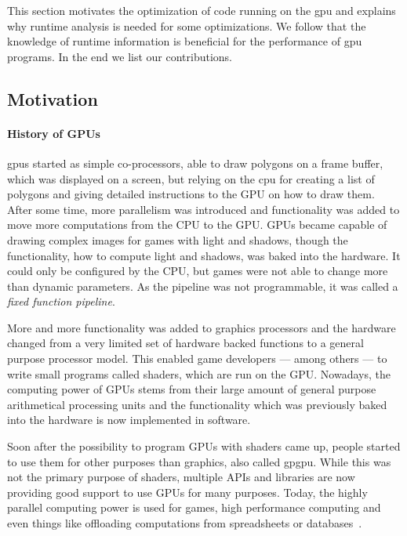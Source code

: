 {}
This section motivates the optimization of code running on the \gls{gpu} and explains why runtime analysis is needed for some optimizations.
We follow that the knowledge of runtime information is beneficial for the performance of \gls{gpu} programs. In the end we list our contributions.

\subsection{Motivation}
\label{sub:motivation}
\paragraph{History of GPUs} \Glspl{gpu} started as simple co-processors, able to draw polygons on a frame buffer, which was displayed on a screen, but relying on the \gls{cpu} for creating a list of polygons and giving detailed instructions to the GPU on how to draw them.
After some time, more parallelism was introduced and functionality was added to move more computations from the CPU to the GPU.
GPUs became capable of drawing complex images for games with light and shadows, though the functionality, how to compute light and shadows, was baked into the hardware.
It could only be configured by the CPU, but games were not able to change more than dynamic parameters.
As the pipeline was not programmable, it was called a \emph{fixed function pipeline}.

More and more functionality was added to graphics processors and the hardware changed from a very limited set of hardware backed functions to a general purpose processor model.
This enabled game developers --- among others --- to write small programs called shaders, which are run on the GPU.
Nowadays, the computing power of GPUs stems from their large amount of general purpose arithmetical processing units and the functionality which was previously baked into the hardware is now implemented in software.~\cite{McClanahan2010}

Soon after the possibility to program GPUs with shaders came up, people started to use them for other purposes than graphics, also called \gls{gpgpu}.
While this was not the primary purpose of shaders, multiple APIs and libraries are now providing good support to use GPUs for many purposes.
Today, the highly parallel computing power is used for games, high performance computing and even things like offloading computations from spreadsheets or databases~\cite{Lillqvist2016, Meraji2015}.

